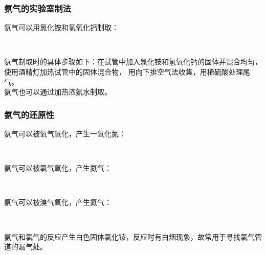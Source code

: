 \documentclass[UTF8]{ctexart}
\begin{document}
\newpage

\subsubsection{氨气的实验室制法}
    氨气可以用氯化铵和氢氧化钙制取：
    \begin{center}
        \\[4mm]
    \end{center}
    氨气制取时的具体步骤如下：在试管中加入氯化铵和氢氧化钙的固体并混合均匀，使用酒精灯加热试管中的固体混合物，
    用向下排空气法收集，用稀硫酸处理尾气。\\[3mm]
    氨气也可以通过加热浓氨水制取。

\subsubsection{氨气的还原性}
    氨气可以被氧气氧化，产生一氧化氮：
    \begin{center}
        \\[4mm]
    \end{center}
    氨气可以被氯气氧化，产生氮气：
    \begin{center}
        \\[4mm]
    \end{center}
    氨气可以被溴气氧化，产生氮气：
    \begin{center}
        \\[4mm]
    \end{center}
    氨气和氯气的反应产生白色固体氯化铵，反应时有白烟现象，故常用于寻找氯气管道的漏气处。
\end{document}
